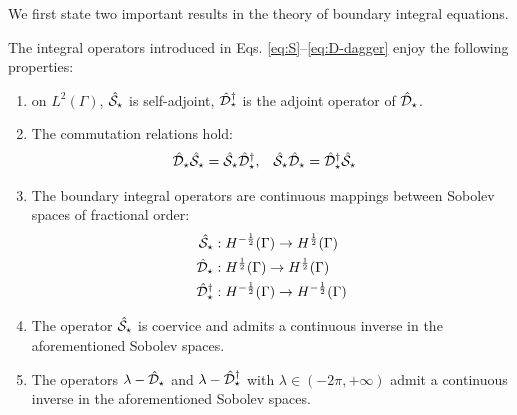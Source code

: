 We first state two important results in the theory of boundary integral
equations.
\begin{lemma}
  The integral operators introduced in Eqs. \eqref{eq:S}--\eqref{eq:D-dagger}
  enjoy the following properties\autocite{Hsiao2008-xb, Sauter2011-an}:
  \begin{enumerate}
      \item on $L^2(\Gamma)$, $\hat{\mathcal{S}}_\star$ is self-adjoint,
        $\hat{\mathcal{D}}^\dagger_\star$ is the adjoint operator of
        $\hat{\mathcal{D}}_\star$.
      \item The commutation relations hold:
        \begin{alignat}{2}
          \hat{\mathcal{D}}_\star\hat{\mathcal{S}}_\star = \hat{\mathcal{S}}_\star\hat{\mathcal{D}}^\dagger_\star, \quad&
          \hat{\mathcal{S}}_\star\hat{\mathcal{D}}_\star = \hat{\mathcal{D}}^\dagger_\star\hat{\mathcal{S}}_\star
        \end{alignat}
      \item The boundary integral operators are continuous
        mappings between Sobolev spaces of fractional order:
        \begin{subequations}
          \begin{align}
   \hat{\mathcal{S}}_\star &: H^{-\frac{1}{2}}(\Gamma) \rightarrow H^{\frac{1}{2}}(\Gamma) \\
   \hat{\mathcal{D}}_\star &: H^{\frac{1}{2}}(\Gamma) \rightarrow H^{\frac{1}{2}}(\Gamma) \\
   \hat{\mathcal{D}}^\dagger_\star &: H^{-\frac{1}{2}}(\Gamma) \rightarrow H^{-\frac{1}{2}}(\Gamma)
          \end{align}
        \end{subequations}
      \item The operator $\hat{\mathcal{S}}_\star$ is coervice and admits a
        continuous inverse in the aforementioned Sobolev spaces.
      \item The operators $\lambda - \hat{\mathcal{D}}_\star$ and $\lambda -
        \hat{\mathcal{D}}^\dagger_\star$ with $\lambda \in (-2\pi, +\infty)$
        admit a continuous inverse in the aforementioned
        Sobolev spaces.
  \end{enumerate}
\end{lemma}

